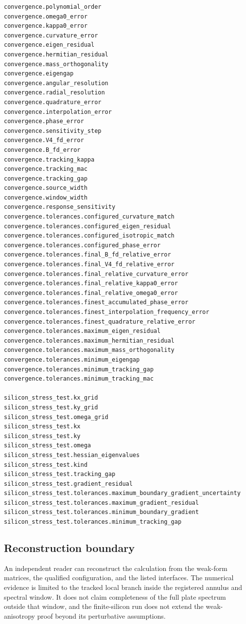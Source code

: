 {\begin{verbatim}
convergence.polynomial_order
convergence.omega0_error
convergence.kappa0_error
convergence.curvature_error
convergence.eigen_residual
convergence.hermitian_residual
convergence.mass_orthogonality
convergence.eigengap
convergence.angular_resolution
convergence.radial_resolution
convergence.quadrature_error
convergence.interpolation_error
convergence.phase_error
convergence.sensitivity_step
convergence.V4_fd_error
convergence.B_fd_error
convergence.tracking_kappa
convergence.tracking_mac
convergence.tracking_gap
convergence.source_width
convergence.window_width
convergence.response_sensitivity
convergence.tolerances.configured_curvature_match
convergence.tolerances.configured_eigen_residual
convergence.tolerances.configured_isotropic_match
convergence.tolerances.configured_phase_error
convergence.tolerances.final_B_fd_relative_error
convergence.tolerances.final_V4_fd_relative_error
convergence.tolerances.final_relative_curvature_error
convergence.tolerances.final_relative_kappa0_error
convergence.tolerances.final_relative_omega0_error
convergence.tolerances.finest_accumulated_phase_error
convergence.tolerances.finest_interpolation_frequency_error
convergence.tolerances.finest_quadrature_relative_error
convergence.tolerances.maximum_eigen_residual
convergence.tolerances.maximum_hermitian_residual
convergence.tolerances.maximum_mass_orthogonality
convergence.tolerances.minimum_eigengap
convergence.tolerances.minimum_tracking_gap
convergence.tolerances.minimum_tracking_mac

silicon_stress_test.kx_grid
silicon_stress_test.ky_grid
silicon_stress_test.omega_grid
silicon_stress_test.kx
silicon_stress_test.ky
silicon_stress_test.omega
silicon_stress_test.hessian_eigenvalues
silicon_stress_test.kind
silicon_stress_test.tracking_gap
silicon_stress_test.gradient_residual
silicon_stress_test.tolerances.maximum_boundary_gradient_uncertainty
silicon_stress_test.tolerances.maximum_gradient_residual
silicon_stress_test.tolerances.minimum_boundary_gradient
silicon_stress_test.tolerances.minimum_tracking_gap
\end{verbatim}
}

\subsection{Reconstruction boundary}

An independent reader can reconstruct the calculation from the weak-form
matrices, the qualified configuration, and the listed interfaces.  The
numerical evidence is limited to the tracked local branch inside the
registered annulus and spectral window.  It does not claim completeness of
the full plate spectrum outside that window, and the finite-silicon run does
not extend the weak-anisotropy proof beyond its perturbative assumptions.
